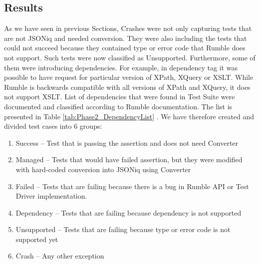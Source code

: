 \subsection{Results}
\label{Phase2_Results}
As we have seen in previous Sections, Crashes were not only capturing tests that are not JSONiq and needed conversion. They were also including the tests that could not succeed because they contained type or error code that Rumble does not support. Such tests were now classified as Unsupported. Furthermore, some of them were introducing dependencies. For example, in dependency tag it was possible to have request for particular version of XPath, XQuery or XSLT. While Rumble is backwards compatible with all versions of XPath and XQuery, it does not support XSLT. List of dependencies that were found in Test Suite were documented and classified according to Rumble documentation. The list is presented in Table \ref{tab:Phase2_DependencyList} . We have therefore created and divided test cases into 6 groups:
\begin{enumerate}
	\item Success – Test that is passing the assertion and does not need Converter
	\item Managed – Tests that would have failed assertion, but they were modified with hard-coded conversion into JSONiq using Converter
	\item Failed – Tests that are failing because there is a bug in Rumble API or Test Driver implementation. 
	\item Dependency – Tests that are failing because dependency is not supported
	\item Unsupported – Tests that are failing because type or error code is not supported yet
	\item Crash – Any other exception
\end{enumerate}

